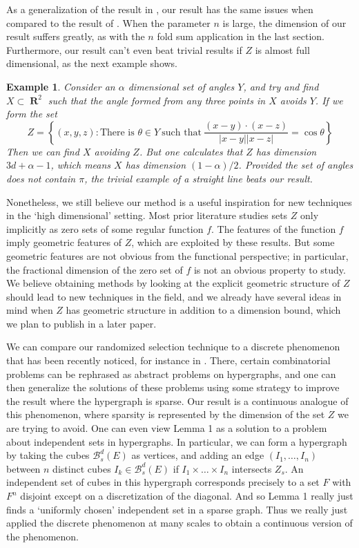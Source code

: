 \documentclass[dvipsnames,letterpaper,12pt]{article}
\theoremstyle{plain}
\newtheorem*{example}{Example}
\DeclareMathOperator{\RR}{\mathbf{R}}
\begin{document}
As a generalization of the result in \cite{MalabikaRob}, our result has the same issues when compared to the result of \cite{Mathe}. When the parameter $n$ is large, the dimension of our result suffers greatly, as with the $n$ fold sum application in the last section. Furthermore, our result can't even beat trivial results if $Z$ is almost full dimensional, as the next example shows.

\begin{example}
	Consider an $\alpha$ dimensional set of angles $Y$, and try and find $X \subset \RR^2$ such that the angle formed from any three points in $X$ avoids $Y$. If we form the set
	\[ Z = \left\{ (x,y,z): \text{There is $\theta \in Y$}\ \text{such that}\ \frac{(x - y) \cdot (x - z)}{|x - y||x - z|} = \cos \theta \right\} \]
	Then we can find $X$ avoiding $Z$. But one calculates that $Z$ has dimension $3d + \alpha - 1$, which means $X$ has dimension $(1 - \alpha) / 2$. Provided the set of angles does not contain $\pi$, the trivial example of a straight line beats our result.
\end{example}

Nonetheless, we still believe our method is a useful inspiration for new techniques in the `high dimensional' setting. Most prior literature studies sets $Z$ only implicitly as zero sets of some regular function $f$. The features of the function $f$ imply geometric features of $Z$, which are exploited by these results. But some geometric features are not obvious from the functional perspective; in particular, the fractional dimension of the zero set of $f$ is not an obvious property to study. We believe obtaining methods by looking at the explicit geometric structure of $Z$ should lead to new techniques in the field, and we already have several ideas in mind when $Z$ has geometric structure in addition to a dimension bound, which we plan to publish in a later paper.

We can compare our randomized selection technique to a discrete phenomenon that has been recently noticed, for instance in \cite{BaloghMorrisSamotij}. There, certain combinatorial problems can be rephrased as abstract problems on hypergraphs, and one can then generalize the solutions of these problems using some strategy to improve the result where the hypergraph is sparse. Our result is a continuous analogue of this phenomenon, where sparsity is represented by the dimension of the set $Z$ we are trying to avoid. One can even view Lemma 1 as a solution to a problem about independent sets in hypergraphs. In particular, we can form a hypergraph by taking the cubes $\mathcal{B}^d_s(E)$ as vertices, and adding an edge $(I_1, \dots, I_n)$ between $n$ distinct cubes $I_k \in \mathcal{B}^d_s(E)$ if $I_1 \times \dots \times I_n$ intersects $Z_s$. An independent set of cubes in this hypergraph corresponds precisely to a set $F$ with $F^n$ disjoint except on a discretization of the diagonal. And so Lemma 1 really just finds a `uniformly chosen' independent set in a sparse graph. Thus we really just applied the discrete phenomenon at many scales to obtain a continuous version of the phenomenon.










\end{document}
